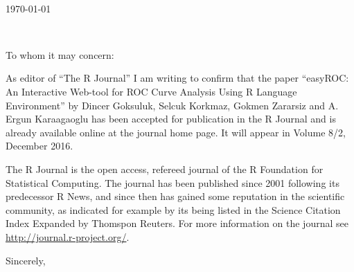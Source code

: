 \documentclass[11pt,a4paper]{letter} %
\def\opening#1{\thispagestyle{empty}
  {\centering\fromaddress \vspace{0.6in} \\ %
    \hspace*{\longindentation}\today\hspace*{\fill}\par} %
  {\raggedright \toname \\ \toaddress \par} %
  \vspace{0.4in} %
  \noindent #1 %
}
\begin{document}

\begin{letter}{}
  
  \opening{To whom it may concern:}

  As editor of ``The R Journal'' I am writing to confirm that the
  paper ``easyROC: An Interactive Web-tool for ROC Curve Analysis
  Using R Language Environment'' by Dincer Goksuluk, Selcuk Korkmaz,
  Gokmen Zararsiz and A. Ergun Karaagaoglu has been accepted for
  publication in the R Journal and is already available online at the
  journal home page. It will appear in Volume 8/2, December 2016.

  The R Journal is the open access, refereed journal of the R Foundation
  for Statistical Computing. The journal has been published since
  2001 following its predecessor R News, and since then has gained some
  reputation in the scientific community, as indicated for example by
  its being listed in the Science Citation Index Expanded by Thomspon
  Reuters. For more information on the journal see
  \url{http://journal.r-project.org/}.

  \closing{Sincerely,}

\end{letter}
\end{document}
